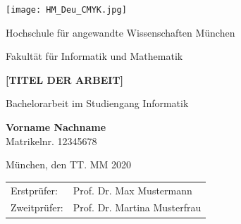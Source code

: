 

\pagestyle{empty}
\overfullrule=3pt


\begin{titlepage}
	\centering
	\setlength{\parindent}{0pt}
	
	\singlespacing
	
	\begin{flushright}
		\texttt{[image: HM\_Deu\_CMYK.jpg]}
	\end{flushright}
	
	\vspace*{10mm}
	
	\begin{Huge}
		Hochschule für angewandte Wissenschaften München \\
	\end{Huge}

	\vspace{10mm}

	\begin{Large}
		Fakultät für Informatik und Mathematik \\
	\end{Large}
	
	\vspace{20mm}
	
	{
		\large
		\sffamily
		\bfseries
		[TITEL DER ARBEIT]
		\par
	}

	\vspace{20mm}
	\normalfont
	Bachelorarbeit im Studiengang Informatik
	
	\vspace{20mm}
	\textsf{\textbf{Vorname Nachname}}\\
	Matrikelnr. 12345678
	
	\vspace{0.5\baselineskip}
	München, den TT. MM 2020
	
	\vfill
	
	\begin{tabular}{@{}ll}
		Erstprüfer: & Prof. Dr. Max Mustermann \\
		Zweitprüfer: & Prof. Dr. Martina Musterfrau \\
	\end{tabular}

\end{titlepage}



